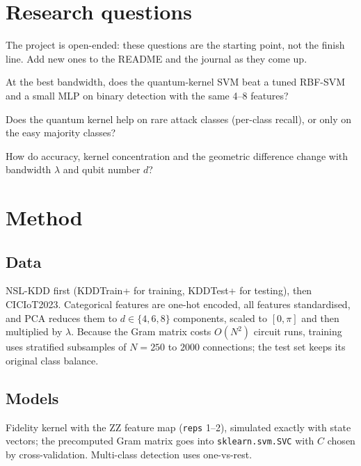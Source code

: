 \documentclass[11pt,a4paper]{article}
\begin{document}
\section{Research questions}
The project is open-ended: these questions are the starting point, not the finish line. Add new
ones to the README and the journal as they come up.

\begin{rqlist}
  \item At the best bandwidth, does the quantum-kernel SVM beat a tuned RBF-SVM and a small MLP on binary detection with the same 4--8 features?
  \item Does the quantum kernel help on rare attack classes (per-class recall), or only on the easy majority classes?
  \item How do accuracy, kernel concentration and the geometric difference change with bandwidth $\lambda$ and qubit number $d$?
\end{rqlist}

\section{Method}
\subsection{Data}
NSL-KDD first (KDDTrain+ for training, KDDTest+ for testing), then CICIoT2023. Categorical
features are one-hot encoded, all features standardised, and PCA reduces them to $d\in\{4,6,8\}$
components, scaled to $[0,\pi]$ and then multiplied by $\lambda$. Because the Gram matrix costs
$O(N^2)$ circuit runs, training uses stratified subsamples of $N=250$ to $2000$ connections; the
test set keeps its original class balance.

\subsection{Models}
Fidelity kernel with the ZZ feature map (\texttt{reps} 1--2), simulated exactly with state vectors;
the precomputed Gram matrix goes into \texttt{sklearn.svm.SVC} \citep{pedregosa2011} with $C$
chosen by cross-validation. Multi-class detection uses one-vs-rest.
\end{document}
